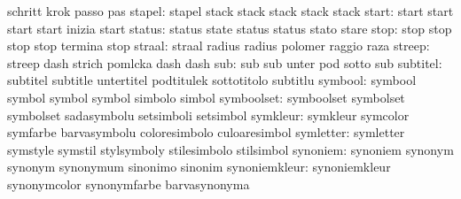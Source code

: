                            schritt                   krok
                           passo                     pas
                   stapel: stapel                    stack
                           stack                     stack
                           stack                     stack %
                    start: start                     start
                           start                     start
                           inizia                    start
                   status: status                    state
                           status                    status
                           stato                     stare
                     stop: stop                      stop
                           stop                      stop
                           termina                   stop
                   straal: straal                    radius
                           radius                    polomer
                           raggio                    raza
                   streep: streep                    dash
                           strich                    pomlcka
                           dash                      dash %
                      sub: sub                       sub
                           unter                     pod
                           sotto                     sub
                 subtitel: subtitel                  subtitle
                           untertitel                podtitulek
                           sottotitolo               subtitlu
                  symbool: symbool                   symbol
                           symbol                    symbol
                           simbolo                   simbol
               symboolset: symboolset                symbolset
                           symbolset                 sadasymbolu
                           setsimboli                setsimbol
                 symkleur: symkleur                  symcolor
                           symfarbe                  barvasymbolu
                           coloresimbolo             culoaresimbol
                symletter: symletter                 symstyle
                           symstil                   stylsymboly
                           stilesimbolo              stilsimbol
                 synoniem: synoniem                  synonym
                           synonym                   synonymum
                           sinonimo                  sinonim
            synoniemkleur: synoniemkleur             synonymcolor
                           synonymfarbe              barvasynonyma
